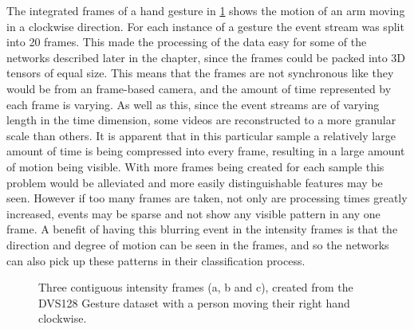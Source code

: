 The integrated frames of a hand gesture in \cref{fig:dvs128_integrated_frames} shows the motion of an arm moving in a clockwise direction. For each instance of a gesture the event stream was split into 20 frames. This made the processing of the data easy for some of the networks described later in the chapter, since the frames could be packed into 3D tensors of equal size. This means that the frames are not synchronous like they would be from an frame-based camera, and the amount of time represented by each frame is varying. As well as this, since the event streams are of varying length in the time dimension, some videos are reconstructed to a more granular scale than others. It is apparent that in this particular sample a relatively large amount of time is being compressed into every frame, resulting in a large amount of motion being visible. With more frames being created for each sample this problem would be alleviated and more easily distinguishable features may be seen. However if too many frames are taken, not only are processing times greatly increased, events may be sparse and not show any visible pattern in any one frame. A benefit of having this blurring event in the intensity frames is that the direction and degree of motion can be seen in the frames, and so the networks can also pick up these patterns in their classification process.

\begin{figure}[htb]%
    \centering
    \qquad
    \qquad
    \caption{Three contiguous intensity frames ({a}, {b} and {c}), created from the DVS128 Gesture dataset with a person moving their right hand clockwise.}%
    \label{fig:dvs128_integrated_frames}%
\end{figure}

